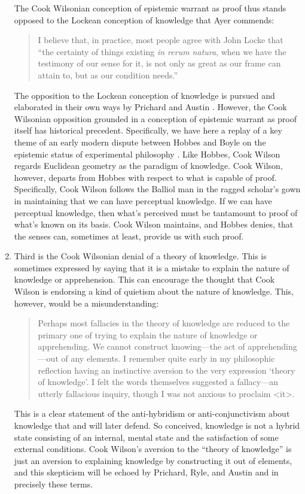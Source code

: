 \documentclass[12pt]{article}
\begin{document}
\begin{enumerate}[(1)]
\begin{quote}
		\end{quote}
The Cook Wilsonian conception of epistemic warrant as proof thus stands opposed to the Lockean conception of knowledge that Ayer commends:
		\begin{quote}
			I believe that, in practice, most people agree with John Locke that ``the certainty of things existing \emph{in rerum natura}, when we have the testimony of our sense for it, is not only as great as our frame can attain to, but as our condition needs.'' \citep[1]{Ayer:1958kx}
		\end{quote}
The opposition to the Lockean conception of knowledge is pursued and elaborated in their own ways by Prichard and Austin \citep[see][for discussion]{Kalderon:2010fk}. However, the Cook Wilsonian opposition grounded in a conception of epistemic warrant as proof itself has historical precedent. Specifically, we have here a replay of a key theme of an early modern dispute between Hobbes and Boyle on the epistemic status of experimental philosophy \citep[see][for discussion]{Shapin:1985ad}. Like Hobbes, Cook Wilson regards Euclidean geometry as the paradigm of knowledge. Cook Wilson, however, departs from Hobbes with respect to what is capable of proof. Specifically, Cook Wilson follows the Balliol man in the ragged scholar's gown in maintaining that we can have perceptual knowledge. If we can have perceptual knowledge, then what's perceived must be tantamount to proof of what's known on its basis. Cook Wilson maintains, and Hobbes denies, that the senses can, sometimes at least, provide us with such proof.
	\item Third is the Cook Wilsonian denial of a theory of knowledge. This is sometimes expressed by saying that it is a mistake to explain the nature of knowledge or apprehension. This can encourage the thought that Cook Wilson is endorsing a kind of quietism about the nature of knowledge. This, however, would be a misunderstanding:
		\begin{quote}
			Perhaps most fallacies in the theory of knowledge are reduced to the primary one of trying to explain the nature of knowledge or apprehending. We cannot construct knowing---the act of apprehending---out of any elements. I remember quite early in my philosophic reflection having an instinctive aversion to the very expression `theory of knowledge'. I felt the words themselves suggested a fallacy---an utterly fallacious inquiry, though I was not anxious to proclaim <it>. \citep[803]{Cook-Wilson:1926sf}
		\end{quote}
This is a clear statement of the anti-hybridism or anti-conjunctivism about knowledge that \citet{McDowell:1982kx} and \citet{Williamson:2000lr} will later defend. So conceived, knowledge is not a hybrid state consisting of an internal, mental state and the satisfaction of some external conditions. Cook Wilson's aversion to the ``theory of knowledge'' is just an aversion to explaining knowledge by constructing it out of elements, and this skepticism will be echoed by Prichard, Ryle, and Austin and in precisely these terms.

\end{enumerate}
\end{document}
